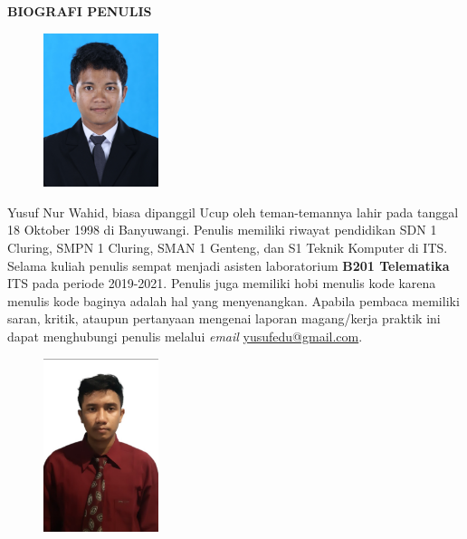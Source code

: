 \begin{center}
  \Large\textbf{BIOGRAFI PENULIS}
\end{center}
\vspace{2ex}


\begin{figure}
  \centering
  \vspace{-3ex}
  \includegraphics[width=0.3\textwidth]{gambar/ynw.jpg}
  \vspace{-4ex}
\end{figure}

\noindent Yusuf Nur Wahid, biasa dipanggil Ucup oleh teman-temannya lahir pada tanggal 18 Oktober 1998 di Banyuwangi.
Penulis memiliki riwayat pendidikan SDN 1 Cluring, SMPN 1 Cluring, SMAN 1 Genteng, dan S1 Teknik Komputer di ITS.
Selama kuliah penulis sempat menjadi asisten laboratorium \textbf{B201 Telematika} ITS pada periode 2019-2021.
Penulis juga memiliki hobi menulis kode karena menulis kode baginya adalah hal yang menyenangkan.
Apabila pembaca memiliki saran, kritik, ataupun pertanyaan mengenai laporan magang/kerja praktik ini dapat menghubungi penulis melalui \textit{email} \href{mailto:yusufedu@gmail.com}{yusufedu@gmail.com}.

\vspace{2ex}

\begin{figure}
  \centering
  \vspace{-3ex}
  \includegraphics[width=0.3\textwidth]{gambar/helmika.png}
  \vspace{-4ex}
\end{figure}


